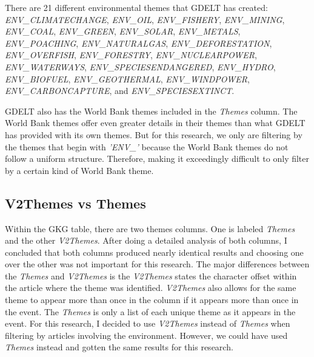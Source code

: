 \documentclass[12pt]{article}
\begin{document}
There are 21 different environmental themes that GDELT has created: 
\linebreak
\setlength{\parindent}{0cm}
\textit{ENV\_CLIMATECHANGE}, \textit{ENV\_OIL}, \textit{ENV\_FISHERY}, \textit{ENV\_MINING}, \textit{ENV\_COAL},
\linebreak
\textit{ENV\_GREEN}, 
\textit{ENV\_SOLAR}, \textit{ENV\_METALS}, \textit{ENV\_POACHING}, \textit{ENV\_NATURALGAS}, 
\linebreak
\textit{ENV\_DEFORESTATION}, \textit{ENV\_OVERFISH}, \textit{ENV\_FORESTRY}, \textit{ENV\_NUCLEARPOWER}, \textit{ENV\_WATERWAYS}, \textit{ENV\_SPECIESENDANGERED}, \textit{ENV\_HYDRO}, \textit{ENV\_BIOFUEL}, 
\linebreak
\textit{ENV\_GEOTHERMAL}, \textit{ENV\_WINDPOWER}, \textit{ENV\_CARBONCAPTURE}, and 
\linebreak
\textit{ENV\_SPECIESEXTINCT}. 
\setlength{\parindent}{1cm}


GDELT also has the World Bank themes included in the \textit{Themes} column. The World Bank themes offer even greater details in their themes than what GDELT has provided with its own themes. But for this research, we only are filtering by the themes that begin with \textit{'ENV\_'} because the World Bank themes do not follow a uniform structure. Therefore, making it exceedingly difficult to only filter by a certain kind of World Bank theme. 

\subsection*{V2Themes vs Themes}

Within the GKG table, there are two themes columns. One is labeled \textit{Themes} and the other \textit{V2Themes}. After doing a detailed analysis of both columns, I concluded that both columns produced nearly identical results and choosing one over the other was not important for this research. The major differences between the \textit{Themes} and \textit{V2Themes} is the \textit{V2Themes} states the character offset within the article where the theme was identified. \textit{V2Themes} also allows for the same theme to appear more than once in the column if it appears more than once in the event. The \textit{Themes} is only a list of each unique theme as it appears in the event. For this research, I decided to use \textit{V2Themes} instead of \textit{Themes} when filtering by articles involving the environment. However, we could have used \textit{Themes} instead and gotten the same results for this research. 
\end{document}
